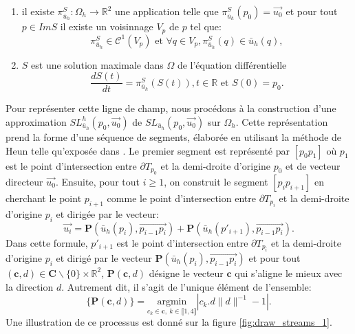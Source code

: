 \begin{enumerate}
\item il existe $\pi_{\bar{u}_h}^S:\Omega_h\longrightarrow\mathbb{R}^2$ une application telle que $\pi_{\bar{u}_h}^S(p_0)=\overrightarrow{u_0}$ et pour tout $p\in Im S$ il existe un voisinnage $V_p$ de $p$ tel que:
\begin{equation}
\pi_{\bar{u}_h}^S\in\mathcal{C}^1(V_p) \mbox{ et }  \forall q\in V_p, \pi_{\bar{u}_h}^S(q)\in \bar{u}_h(q),
\end{equation}
\item $S$ est une solution maximale dans $\Omega$ de l'équation différentielle
\begin{equation}
\frac{dS(t)}{dt}=\pi_{\bar{u}_h}^S(S(t)),t\in \mathbb{R} \text{ et }  S(0)=p_0.
\end{equation}
\end{enumerate}
Pour représenter cette ligne de champ, nous procédons à la construction d'une approximation $SL^h_{\bar{u}_h}(p_0, \overrightarrow{u_0})$ de $SL_{\bar{u}_h}(p_0, \overrightarrow{u_0})$ sur $\Omega_h$.  Cette représentation prend la forme d'une séquence de segments, élaborée en utilisant la méthode de Heun \cite{ascher1998computer} telle qu'exposée dans \cite{kowalski2013pde}. Le premier segment est représenté par $[p_0p_1]$ où $p_1$ est le point d'intersection entre $\partial T_{p_0}$ et la demi-droite d'origine $p_0$ et de vecteur directeur $\overrightarrow{u_0}$. Ensuite, pour tout $i\geq 1$, on construit le segment  $[p_ip_{i+1}]$ en cherchant le point $p_{i+1}$ comme le point d'intersection entre $\partial T_{p_i}$ et la demi-droite d'origine $p_i$ et dirigée par le vecteur:
\begin{equation}
\overrightarrow{u_i}=\mathbf{P}(\bar{u}_h(p_i), \overrightarrow{p_{i-1}p_i})+\mathbf{P}(\bar{u}_h(p'_{i+1}), \overrightarrow{p_{i-1}p_i}).
\end{equation}
Dans cette formule, $p'_{i+1}$ est le point d'intersection entre $\partial T_{p_i}$ et la demi-droite d'origine $p_i$ et dirigé par le vecteur $\mathbf{P}(\bar{u}_h(p_i), \overrightarrow{p_{i-1}p_i})$ et pour tout $(\mathbf{c},d)\in\mathbf{C}\backslash\{0\}\times\mathbb{R}^2$, $\mathbf{P}(\mathbf{c}, d)$ désigne le vecteur $\mathbf{c}$ qui s'aligne le mieux avec la direction $d$. Autrement dit, il s'agit de l'unique élément de l'ensemble:
\begin{equation}
\{\mathbf{P}(\mathbf{c}, d)\}=\underset{c_k\in\mathbf{c},~k\in\llbracket1, 4\rrbracket}{\mathrm{argmin}}|c_k.d\|d\|^{-1}-1|.
\end{equation}
Une illustration de ce processus est donné sur la figure \ref{fig:draw_streams_1}.

